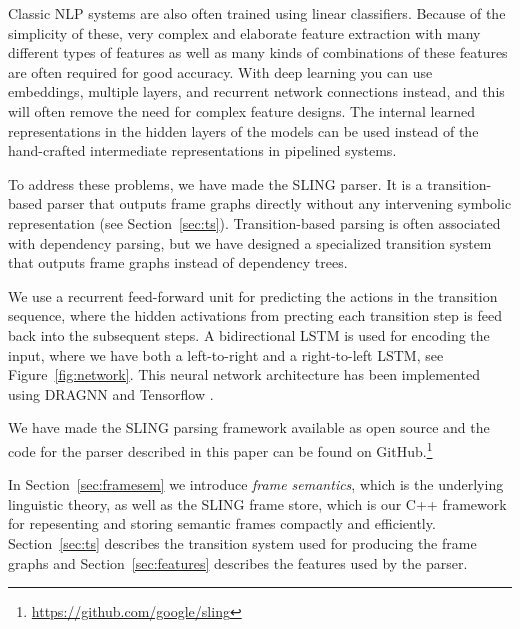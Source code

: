 \documentclass[11pt,a4paper]{article}
\begin{document}
Classic NLP systems are also often trained using linear classifiers.
Because of the simplicity of these, very complex and elaborate feature
extraction with many different types of features as well as many kinds
of combinations of these features are often required for good accuracy.
With deep learning you can use embeddings, multiple layers, and recurrent
network connections instead, and this will often remove the need for complex
feature designs. The internal learned representations in the hidden layers of
the models can be used instead of the hand-crafted intermediate representations
in pipelined systems.

To address these problems, we have made the SLING parser. It is a
transition-based parser that outputs frame graphs directly without any
intervening symbolic representation (see Section~\ref{sec:ts}). Transition-based
parsing is often associated with dependency parsing, but we have designed a
specialized transition system that outputs frame graphs instead of dependency
trees.

We use a recurrent feed-forward unit for predicting the actions in the
transition sequence, where the hidden activations from precting each transition
step is feed back into the subsequent steps.
A bidirectional LSTM is used for encoding the input, where we have both a
left-to-right and a right-to-left LSTM, see Figure~\ref{fig:network}.
This neural network architecture has been implemented using DRAGNN \cite{dragnn}
and Tensorflow \cite{tensorflow}.

We have made the SLING parsing framework available as open source and the code
for the parser described in this paper can be found on GitHub.\footnote{\url{https://github.com/google/sling}}

In Section~\ref{sec:framesem} we introduce \emph{frame semantics}, which is the
underlying linguistic theory, as well as the SLING frame store, which is our
C++ framework for repesenting and storing semantic frames compactly and
efficiently.
Section~\ref{sec:ts} describes the transition system used for producing the
frame graphs and Section~\ref{sec:features} describes the features used by the parser.

\begin{figure*}[t]
  \centering
  
  \caption{Neural network architecture for SLING parser. The input is encoded by
  a bi-directional LSTM and the LSTM encoding is then feed into a recurrent
  feed-forward (FF) unit which predicts the actions for the transition system.
  The hidden layer activations as well as the transition system state is used
  for constructing the input feature vector for the next step. The FF unit is
  run repeatedly until the transition system has reached a terminal state.}
  \label{fig:network}
\end{figure*}
\end{document}
